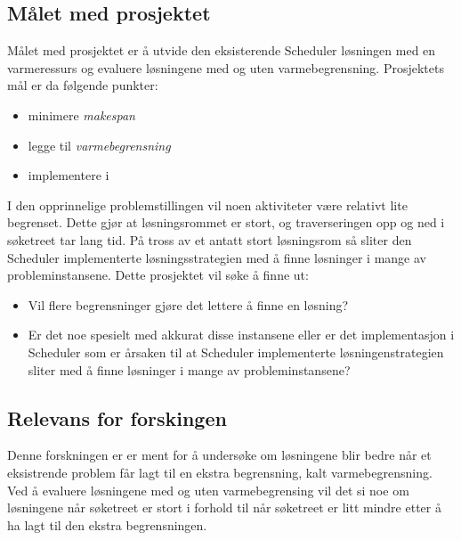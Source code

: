 \subsection{Målet med prosjektet}
Målet med prosjektet er å utvide den eksisterende Scheduler løsningen med en varmeressurs og evaluere løsningene med og uten varmebegrensning. Prosjektets mål er da følgende punkter:
\begin{itemize}
\item minimere \textit{makespan}
\item legge til \textit{varmebegrensning}
\item implementere i \ilog
\end{itemize}

I den opprinnelige problemstillingen vil noen aktiviteter være relativt lite begrenset. Dette gjør at løsningsrommet er stort, og traverseringen opp og ned i søketreet tar lang tid. På tross av et antatt stort løsningsrom så sliter den Scheduler implementerte løsningsstrategien med å finne løsninger i mange av probleminstansene. Dette prosjektet vil søke å finne ut:

\begin{itemize}
\item Vil flere begrensninger gjøre det lettere å finne en løsning?
\item Er det noe spesielt med akkurat disse instansene eller er det implementasjon i Scheduler som er årsaken til at Scheduler implementerte løsningenstrategien sliter med å finne løsninger i mange av probleminstansene?
\end{itemize}

\subsection{Relevans for forskingen}
Denne forskningen er er ment for å undersøke om løsningene blir bedre når et eksistrende problem får lagt til en ekstra begrensning, kalt varmebegrensning. Ved å evaluere løsningene med og uten varmebegrensing vil det si noe om løsningene når søketreet er stort i forhold til når søketreet er litt mindre etter å ha lagt til den ekstra begrensningen.